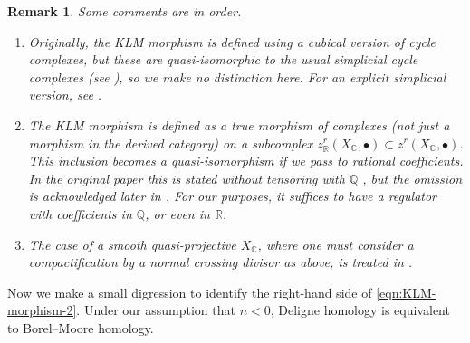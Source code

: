 \documentclass[10pt,a4paper,oneside,draft]{article}
\newcommand{\CC}{\mathbb{C}}
\newcommand{\QQ}{\mathbb{Q}}
\newcommand{\RR}{\mathbb{R}}
\theoremstyle{myplain}
\theoremstyle{mydefinition}
\newtheorem{remark}[theorem]{Remark}
\numberwithin{equation}{section}
\begin{document}
\begin{remark}
  Some comments are in order.

  \begin{enumerate}
  \item Originally, the KLM morphism is defined using a cubical version of cycle
    complexes, but these are quasi-isomorphic to the usual simplicial cycle
    complexes (see \cite{Levine-1994}), so we make no distinction here.
    For an explicit simplicial version, see \cite{Kerr-Lewis-Lopatto-2018}.

  \item The KLM morphism is defined as a true morphism of complexes (not just a
    morphism in the derived category) on a subcomplex
    $z^r_\RR (X_\CC, \bullet) \subset z^r (X_\CC, \bullet)$. This inclusion
    becomes a quasi-isomorphism if we pass to rational coefficients. In the
    original paper \cite{Kerr-Lewis-Muller-Stach-2006} this is stated without
    tensoring with $\QQ$ , but the omission is acknowledged later in
    \cite{Kerr-Lewis-2007}. For our purposes, it suffices to have a
    regulator with coefficients in $\QQ$, or even in $\RR$.

  \item The case of a smooth quasi-projective $X_\CC$, where one must consider a
    compactification by a normal crossing divisor as above, is treated in
    \cite[\S 5.9]{Kerr-Lewis-Muller-Stach-2006}.
  \end{enumerate}
\end{remark}

Now we make a small digression to identify the right-hand side of
\eqref{eqn:KLM-morphism-2}. Under our assumption that $n < 0$, Deligne
homology is equivalent to Borel--Moore homology.
\end{document}
